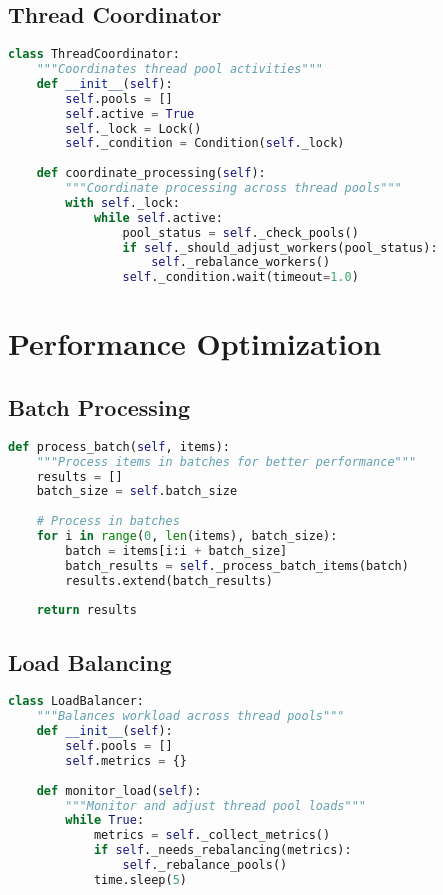 \subsection{Thread Coordinator}
\begin{lstlisting}[language=Python]
class ThreadCoordinator:
    """Coordinates thread pool activities"""
    def __init__(self):
        self.pools = []
        self.active = True
        self._lock = Lock()
        self._condition = Condition(self._lock)
        
    def coordinate_processing(self):
        """Coordinate processing across thread pools"""
        with self._lock:
            while self.active:
                pool_status = self._check_pools()
                if self._should_adjust_workers(pool_status):
                    self._rebalance_workers()
                self._condition.wait(timeout=1.0)
\end{lstlisting}

\section{Performance Optimization}

\subsection{Batch Processing}
\begin{lstlisting}[language=Python]
def process_batch(self, items):
    """Process items in batches for better performance"""
    results = []
    batch_size = self.batch_size
    
    # Process in batches
    for i in range(0, len(items), batch_size):
        batch = items[i:i + batch_size]
        batch_results = self._process_batch_items(batch)
        results.extend(batch_results)
    
    return results
\end{lstlisting}

\subsection{Load Balancing}
\begin{lstlisting}[language=Python]
class LoadBalancer:
    """Balances workload across thread pools"""
    def __init__(self):
        self.pools = []
        self.metrics = {}
        
    def monitor_load(self):
        """Monitor and adjust thread pool loads"""
        while True:
            metrics = self._collect_metrics()
            if self._needs_rebalancing(metrics):
                self._rebalance_pools()
            time.sleep(5)
\end{lstlisting}

